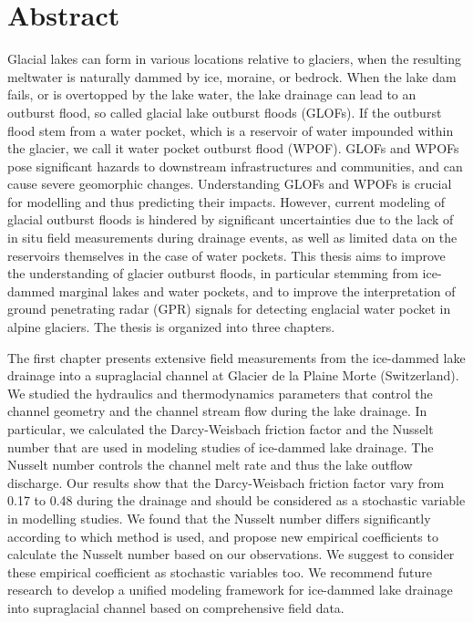 \begingroup
\let\clearpage\relax
\let\cleardoublepage\relax
\let\cleardoublepage\relax

\chapter*{Abstract}


Glacial lakes can form in various locations relative to glaciers, when the resulting meltwater is naturally dammed by ice, moraine, or bedrock. When the lake dam fails, or is overtopped by the lake water, the lake drainage can lead to an outburst flood, so called glacial lake outburst floods (GLOFs). If the outburst flood stem from a water pocket, which is a reservoir of water impounded within the glacier, we call it water pocket outburst flood (WPOF). GLOFs and WPOFs pose significant hazards to downstream infrastructures and communities, and can cause severe geomorphic changes. Understanding GLOFs and WPOFs is crucial for modelling and thus predicting their impacts. However, current modeling of glacial outburst floods is hindered by significant uncertainties due to the lack of in situ field measurements during drainage events, as well as limited data on the reservoirs themselves in the case of water pockets. This thesis aims to improve the understanding of glacier outburst floods, in particular stemming from ice-dammed marginal lakes and water pockets, and to improve the interpretation of ground penetrating radar (GPR) signals for detecting englacial water pocket in alpine glaciers. The thesis is organized into three chapters.
%

The first chapter presents extensive field measurements from the ice-dammed lake drainage into a supraglacial channel at Glacier de la Plaine Morte (Switzerland). We studied the hydraulics and thermodynamics parameters that control the channel geometry and the channel stream flow during the lake drainage. In particular, we calculated the Darcy-Weisbach friction factor and the Nusselt number that are used in modeling studies of ice-dammed lake drainage. The Nusselt number controls the channel melt rate and thus the lake outflow discharge. Our results show that the Darcy-Weisbach friction factor vary from 0.17 to 0.48 during the drainage and should be considered as a stochastic variable in modelling studies. We found that the Nusselt number differs significantly according to which method is used, and propose new empirical coefficients to calculate the Nusselt number based on our observations. We suggest to consider these empirical coefficient as stochastic variables too. We recommend future research to develop a unified modeling framework for ice-dammed lake drainage into supraglacial channel based on comprehensive field data.
%

